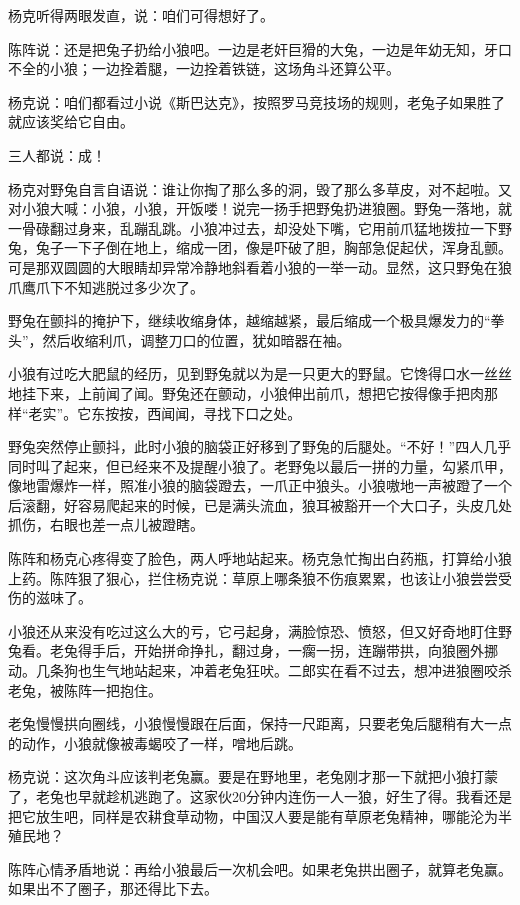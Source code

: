 \par 杨克听得两眼发直，说：咱们可得想好了。
\par 陈阵说：还是把兔子扔给小狼吧。一边是老奸巨猾的大兔，一边是年幼无知，牙口不全的小狼；一边拴着腿，一边拴着铁链，这场角斗还算公平。
\par 杨克说：咱们都看过小说《斯巴达克》，按照罗马竞技场的规则，老兔子如果胜了就应该奖给它自由。
\par 三人都说：成！
\par 杨克对野兔自言自语说：谁让你掏了那么多的洞，毁了那么多草皮，对不起啦。又对小狼大喊：小狼，小狼，开饭喽！说完一扬手把野兔扔进狼圈。野兔一落地，就一骨碌翻过身来，乱蹦乱跳。小狼冲过去，却没处下嘴，它用前爪猛地拨拉一下野兔，兔子一下子倒在地上，缩成一团，像是吓破了胆，胸部急促起伏，浑身乱颤。可是那双圆圆的大眼睛却异常冷静地斜看着小狼的一举一动。显然，这只野兔在狼爪鹰爪下不知逃脱过多少次了。
\par 野兔在颤抖的掩护下，继续收缩身体，越缩越紧，最后缩成一个极具爆发力的“拳头”，然后收缩利爪，调整刀口的位置，犹如暗器在袖。
\par 小狼有过吃大肥鼠的经历，见到野兔就以为是一只更大的野鼠。它馋得口水一丝丝地挂下来，上前闻了闻。野兔还在颤动，小狼伸出前爪，想把它按得像手把肉那样“老实”。它东按按，西闻闻，寻找下口之处。
\par 野兔突然停止颤抖，此时小狼的脑袋正好移到了野兔的后腿处。“不好！”四人几乎同时叫了起来，但已经来不及提醒小狼了。老野兔以最后一拼的力量，勾紧爪甲，像地雷爆炸一样，照准小狼的脑袋蹬去，一爪正中狼头。小狼嗷地一声被蹬了一个后滚翻，好容易爬起来的时候，已是满头流血，狼耳被豁开一个大口子，头皮几处抓伤，右眼也差一点儿被蹬瞎。
\par 陈阵和杨克心疼得变了脸色，两人呼地站起来。杨克急忙掏出白药瓶，打算给小狼上药。陈阵狠了狠心，拦住杨克说：草原上哪条狼不伤痕累累，也该让小狼尝尝受伤的滋味了。
\par 小狼还从来没有吃过这么大的亏，它弓起身，满脸惊恐、愤怒，但又好奇地盯住野兔看。老兔得手后，开始拼命挣扎，翻过身，一瘸一拐，连蹦带拱，向狼圈外挪动。几条狗也生气地站起来，冲着老兔狂吠。二郎实在看不过去，想冲进狼圈咬杀老兔，被陈阵一把抱住。
\par 老兔慢慢拱向圈线，小狼慢慢跟在后面，保持一尺距离，只要老兔后腿稍有大一点的动作，小狼就像被毒蝎咬了一样，噌地后跳。
\par 杨克说：这次角斗应该判老兔赢。要是在野地里，老兔刚才那一下就把小狼打蒙了，老兔也早就趁机逃跑了。这家伙20分钟内连伤一人一狼，好生了得。我看还是把它放生吧，同样是农耕食草动物，中国汉人要是能有草原老兔精神，哪能沦为半殖民地？
\par 陈阵心情矛盾地说：再给小狼最后一次机会吧。如果老兔拱出圈子，就算老兔赢。如果出不了圈子，那还得比下去。
